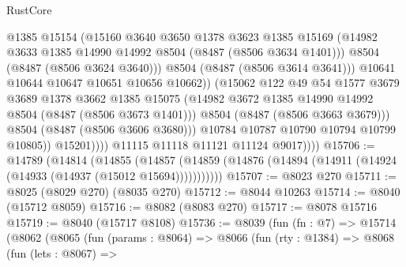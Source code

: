\begin{lexlean}{RustCore}
\begin{coremodule}
                                @1385
                                @15154
                                (@15160
                                  @3640
                                  @3650
                                  @1378
                                  @3623
                                  @1385
                                  @15169
                                  (@14982
                                    @3633
                                    @1385
                                    @14990
                                    @14992
                                    @8504
                                    (@8487 (@8506 @3634 @1401)))
                                  @8504
                                  (@8487 (@8506 @3624 @3640)))
                                @8504
                                (@8487 (@8506 @3614 @3641)))
                              @10641
                              @10644
                              @10647
                              @10651
                              @10656
                              @10662))
                          (@15062
                            @122
                            @49
                            @54
                            @1577
                            @3679
                            @3689
                            @1378
                            @3662
                            @1385
                            @15075
                            (@14982 @3672 @1385 @14990 @14992 @8504 (@8487 (@8506 @3673 @1401)))
                            @8504
                            (@8487 (@8506 @3663 @3679)))
                          @8504
                          (@8487 (@8506 @3606 @3680)))
                        @10784
                        @10787
                        @10790
                        @10794
                        @10799
                        @10805))
                    @15201))))
            @11115
            @11118
            @11121
            @11124
            @9017))))
@15706 := @14789
    (@14814
      (@14855
        (@14857 (@14859 (@14876 (@14894 (@14911 (@14924 (@14933 (@14937 (@15012 @15694)))))))))))
@15707 := @8023 @270
@15711 := @8025 (@8029 @270) (@8035 @270)
@15712 := @8044 @10263
@15714 := @8040 (@15712 @8059)
@15716 := @8082 (@8083 @270)
@15717 := @8078 @15716
@15719 := @8040 (@15717 @8108)
@15736 := @8039
    (fun (fn : @7) =>
    @15714
      (@8062
        (@8065
          (fun (params : @8064) =>
          @8066
            (fun (rty : @1384) =>
            @8068
              (fun (lets : @8067) =>

\end{coremodule}
\end{lexlean}
